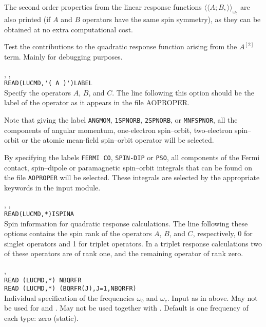 The second order properties from the linear response functions
$\langle\!\langle A;B,\rangle\!\rangle_{\omega_b}$ are also printed
(if $A$ and $B$ operators have the same spin symmetry),
as they can be obtained at no extra computational cost.

\begin{description}

\item{}
Test the contributions to the quadratic response function arising from
the $A^{\left[2\right]}$ term. Mainly for debugging purposes.

\item{, , }\\
\verb|READ(LUCMD,'( A )')LABEL|\\
Specify the operators $A$, $B$, and $C$. The line following this
option should be the label of the operator as it appears in the file
AOPROPER. 

Note that giving the label \verb|ANGMOM|, \verb|1SPNORB|,
\verb|2SPNORB|, or \verb|MNFSPNOR|, all the components of angular
momentum, one-electron spin--orbit, two-electron spin--orbit or the
atomic mean-field spin--orbit operator will be selected.

By specifying the labels \verb|FERMI CO|, \verb|SPIN-DIP| or
\verb|PSO|, all components of the Fermi contact, spin--dipole or
paramagnetic spin--orbit integrals that can be found on the file
\verb|AOPROPER| will be selected. These integrals are selected by the
appropriate keywords in the  input module.

\item{, , }\\
\verb|READ(LUCMD,*)ISPINA|\\
Spin information for quadratic response calculations.
The line following these options contains the spin
rank of the operators 
$A$, $B$, and $C$, respectively, 0 for singlet operators and 1 for triplet
operators.
In a triplet response calculations two of these operators are of rank one,
and the remaining operator of rank zero.

\item{, }\\
\verb|READ (LUCMD,*) NBQRFR|\\
\verb|READ (LUCMD,*) (BQRFR(J),J=1,NBQRFR)|\\
Individual specification of the frequencies $\omega_b$ and $\omega_c$.
Input as in  above.
May not be used for  and .
May not be used together with .
Default is one frequency of each type: zero (static).


\end{description}
